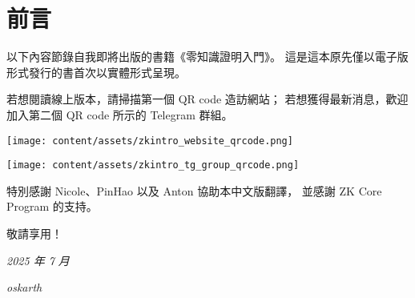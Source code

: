 \setlength{\parskip}{0.25em}

\section*{前言}
\vspace{0.5cm}

以下內容節錄自我即將出版的書籍《零知識證明入門》。
這是這本原先僅以電子版形式發行的書首次以實體形式呈現。

若想閱讀線上版本，請掃描第一個 QR code 造訪網站；
若想獲得最新消息，歡迎加入第二個 QR code 所示的 Telegram 群組。

\vspace{0.25cm}
\begin{center}
\texttt{[image: content/assets/zkintro\_website\_qrcode.png]}
\end{center}
\vspace{0.2cm}
\begin{center}
\texttt{[image: content/assets/zkintro\_tg\_group\_qrcode.png]}
\end{center}
\vspace{0.2cm}

特別感謝 Nicole、PinHao 以及 Anton 協助本中文版翻譯，
並感謝 ZK Core Program 的支持。

\vspace{0.5cm}
敬請享用！

\textit{2025 年 7 月}

\textit{oskarth}

\thispagestyle{empty}